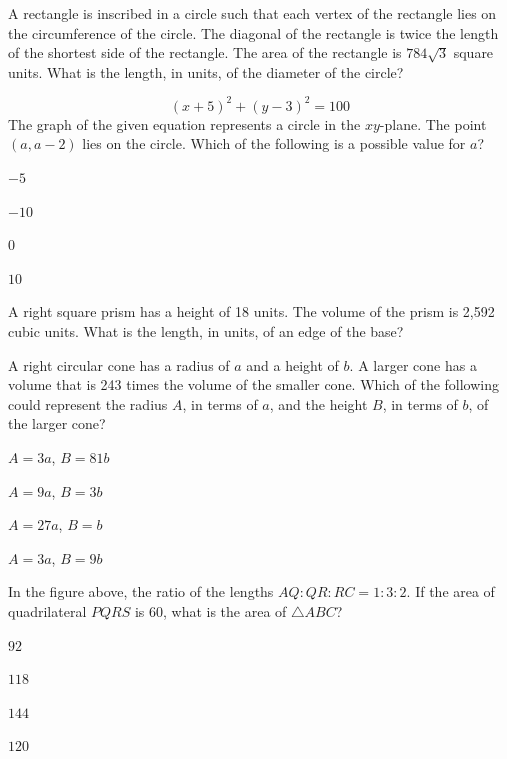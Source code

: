\vfill
\noindent\begin{minipage}{\linewidth}
\par\smallskip
A rectangle is inscribed in a circle such that each vertex of the rectangle lies on the circumference of the circle. The diagonal of the rectangle is twice the length of the shortest side of the rectangle. The area of the rectangle is $784\sqrt{3}$ square units. What is the length, in units, of the diameter of the circle?
\end{minipage}
\vfill
\noindent\begin{minipage}{\linewidth}
\par\smallskip
$$(x+5)^2+(y-3)^2=100$$ The graph of the given equation represents a circle in the $xy$-plane. The point $(a,a-2)$ lies on the circle. Which of the following is a possible value for $a$?
\begin{satchoices}
  \item[A)] $-5$
  \item[B)] $-10$
  \item[C)] $0$
  \item[D)] $10$
\end{satchoices}
\end{minipage}
\vfill
\clearpage
\noindent\begin{minipage}{\linewidth}
\par\smallskip
A right square prism has a height of 18 units. The volume of the prism is 2,592 cubic units. What is the length, in units, of an edge of the base?
\end{minipage}
\vfill
\noindent\begin{minipage}{\linewidth}
\par\smallskip
A right circular cone has a radius of $a$ and a height of $b$. A larger cone has a volume that is 243 times the volume of the smaller cone. Which of the following could represent the radius $A$, in terms of $a$, and the height $B$, in terms of $b$, of the larger cone?
\begin{satchoices}
  \item[A)] $A=3a$, $B=81b$
  \item[B)] $A=9a$, $B=3b$
  \item[C)] $A=27a$, $B=b$
  \item[D)] $A=3a$, $B=9b$
\end{satchoices}
\end{minipage}
\vfill
\noindent\begin{minipage}{\linewidth}
\par\smallskip
In the figure above, the ratio of the lengths $AQ:QR:RC=1:3:2$. If the area of quadrilateral $PQRS$ is 60, what is the area of $\triangle ABC$?
\satfig{\figtrianglepqrs}
\begin{satchoices}
  \item[A)] $92$
  \item[B)] $118$
  \item[C)] $144$
  \item[D)] $120$
\end{satchoices}
\end{minipage}
